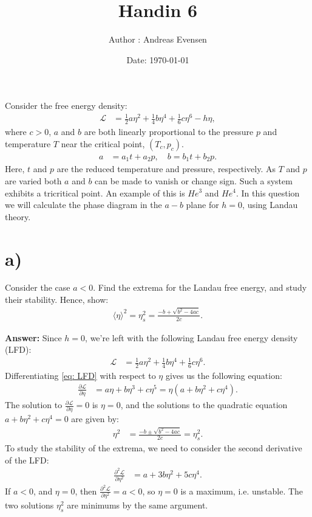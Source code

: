 \documentclass[a4paper]{article}
\title{Handin 6}
\author{Author : Andreas Evensen}
\date{Date: \today}
\newcommand{\newparagraph}{\vspace{.5cm}\noindent}
\newcommand{\fpartial}[2]{\frac{\partial #1}{\partial #2}}
\newcommand{\average}[1]{\langle #1 \rangle}
\begin{document}
\maketitle

\noindent
Consider the free energy density:
\begin{align*}
    \mathcal{L} &= \frac{1}{2}a\eta^2 + \frac{1}{4}b\eta^4 + \frac{1}{6}c\eta^6 - h\eta,
\end{align*}where $ c> 0 $, $a$ and $b$ are both linearly proportional to the pressure $p$ and temperature $T$ near the critical point, $(T_c, p_c)$.
\begin{align*}
    a &= a_1t + a_2p,\quad b = b_1t + b_2p.
\end{align*}Here, $t$ and $p$ are the reduced temperature and pressure, respectively.
As $T$ and $p$ are varied both $a$ and $b$ can be made to vanish or change sign.
Such a system exhibits a tricritical point. An example of this is $He^3$ and $He^4$.
In this question we will calculate the phase diagram in the $a-b$ plane for $h = 0$, using Landau theory.

\section*{a)}
Consider the case $a<0$. Find the extrema for the Landau free energy, and study their stability. Hence, show:
\begin{align*}
    \average{\eta}^2=\eta_s^2 = \frac{-b + \sqrt{b^2 - 4ac}}{2c}.
\end{align*}

\newparagraph
\textbf{Answer: } Since $h = 0$, we're left with the following Landau free energy density (LFD):
\begin{align}
    \mathcal{L} &= \frac{1}{2}a\eta^2 + \frac{1}{4}b\eta^4 + \frac{1}{6}c\eta^6. \label{eq: LFD}
\end{align}Differentiating \eqref{eq: LFD} with respect to $\eta$ gives us the following equation:
\begin{align*}
    \fpartial{\mathcal{L}}{\eta} &= a\eta + b\eta^3 + c\eta^5 = \eta(a + b\eta^2 + c\eta^4).
\end{align*}The solution to $\fpartial{\mathcal{L}}{\eta} = 0$ is $\eta = 0$, and the solutions to the quadratic equation $a + b\eta^2 + c\eta^4 = 0$ are given by:
\begin{align*}
    \eta^2 &= \frac{-b \pm \sqrt{b^2 - 4ac}}{2c} = \eta_s^2.
\end{align*}To study the stability of the extrema, we need to consider the second derivative of the LFD:
\begin{align*}
    \fpartial{^2\mathcal{L}}{\eta^2} &= a + 3b\eta^2 + 5c\eta^4.
\end{align*}
If $a < 0$, and $\eta = 0$, then $\fpartial{^2\mathcal{L}}{\eta^2} = a < 0$, so $\eta = 0$ is a maximum, i.e. unstable.
The two solutions $\eta_s^2$ are minimums by the same argument.
\end{document}
